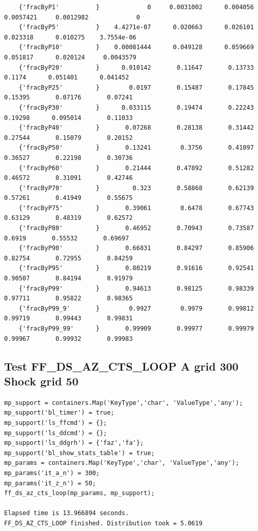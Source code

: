 \documentclass[
]{book}
\begin{document}
\begin{verbatim}
    {'fracByP1'          }             0     0.0031002      0.004056     0.0057421     0.0012982             0 
    {'fracByP5'          }    4.4271e-07      0.020663      0.026101      0.023318      0.010275    3.7554e-06 
    {'fracByP10'         }    0.00081444      0.049128      0.059669      0.051817      0.020124     0.0043579 
    {'fracByP20'         }      0.010142       0.11647       0.13733        0.1174      0.051401      0.041452 
    {'fracByP25'         }        0.0197       0.15487       0.17845       0.15395       0.07176       0.07241 
    {'fracByP30'         }      0.033115       0.19474       0.22243       0.19298      0.095014       0.11033 
    {'fracByP40'         }       0.07268       0.28138       0.31442       0.27544       0.15079       0.20152 
    {'fracByP50'         }       0.13241        0.3756       0.41097       0.36527       0.22198       0.30736 
    {'fracByP60'         }       0.21444       0.47892       0.51282       0.46572       0.31091       0.42746 
    {'fracByP70'         }         0.323       0.58868       0.62139       0.57261       0.41949       0.55675 
    {'fracByP75'         }       0.39061        0.6478       0.67743       0.63129       0.48319       0.62572 
    {'fracByP80'         }       0.46952       0.70943       0.73587        0.6919       0.55532       0.69697 
    {'fracByP90'         }       0.66831       0.84297       0.85906       0.82754       0.72955       0.84259 
    {'fracByP95'         }       0.80219       0.91616       0.92541       0.90507       0.84194       0.91979 
    {'fracByP99'         }       0.94613       0.98125       0.98339       0.97711       0.95822       0.98365 
    {'fracByP99_9'       }        0.9927        0.9979       0.99812       0.99719       0.99443       0.99831 
    {'fracByP99_99'      }       0.99909       0.99977       0.99979       0.99967       0.99932       0.99983 
\end{verbatim}

\hypertarget{test-ff_ds_az_cts_loop-a-grid-300-shock-grid-50}{%
\subsection{Test FF\_DS\_AZ\_CTS\_LOOP A grid 300 Shock grid 50}\label{test-ff_ds_az_cts_loop-a-grid-300-shock-grid-50}}

\begin{verbatim}
mp_support = containers.Map('KeyType','char', 'ValueType','any');
mp_support('bl_timer') = true;
mp_support('ls_ffcmd') = {};
mp_support('ls_ddcmd') = {};
mp_support('ls_ddgrh') = {'faz','fa'};
mp_support('bl_show_stats_table') = true;
mp_params = containers.Map('KeyType','char', 'ValueType','any');
mp_params('it_a_n') = 300;
mp_params('it_z_n') = 50;
ff_ds_az_cts_loop(mp_params, mp_support);

Elapsed time is 13.966894 seconds.
FF_DS_AZ_CTS_LOOP finished. Distribution took = 5.0619
\end{verbatim}
\end{document}
